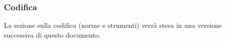	\subsubsection{Codifica} \label{sec:cod}
	La sezione sulla codifica (norme e strumenti) verrà stesa in una versione successiva di questo documento.
